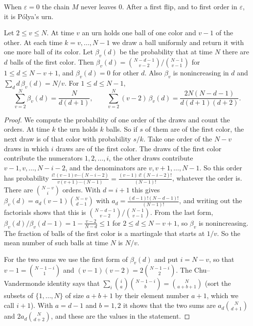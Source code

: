 When $\varepsilon=0$ the chain $M$ never leaves 0. After a first flip, and to
first order in $\varepsilon$, it is P\'olya's urn.

\begin{lemma}\label{lem:urn}
Let $2\le v\le N$. At time $v$ an urn holds one ball of one color and $v-1$
of the other. At each time $k=v,\dots,N-1$ we draw a ball uniformly and
return it with one more ball of its color. Let $\beta_v(d)$ be the
probability that at time $N$ there are $d$ balls of the first color. Then
$\beta_v(d)=\binom{N-d-1}{v-2}/\binom{N-1}{v-1}$ for $1\le d\le N-v+1$, and
$\beta_v(d)=0$ for other $d$. Also $\beta_v$ is nonincreasing in $d$ and
$\sum_dd\,\beta_v(d)=N/v$. For $1\le d\le N-1$,
\[
 \sum_{v=2}^N\beta_v(d)=\frac{N}{d(d+1)},\qquad
 \sum_{v=2}^N(v-2)\,\beta_v(d)=\frac{2N(N-d-1)}{d(d+1)(d+2)} .
\]
\end{lemma}

\begin{proof}
We compute the probability of one order of the draws and count the orders.
At time $k$ the urn holds $k$ balls. So if $s$ of them are of the first
color, the next draw is of that color with probability $s/k$. Take one order
of the $N-v$ draws in which $i$ draws are of the first color. The draws of
the first color contribute the numerators $1,2,\dots,i$, the other draws
contribute $v-1,v,\dots,N-i-2$, and the denominators are $v,v+1,\dots,N-1$.
So this order has probability
$\frac{i!\,(v-1)v\cdots(N-i-2)}{v(v+1)\cdots(N-1)}=\frac{(v-1)\,i!\,(N-i-2)!}{(N-1)!}$,
whatever the order is. There are $\binom{N-v}{i}$ orders. With $d=i+1$ this
gives $\beta_v(d)=a_d(v-1)\binom{N-v}{d-1}$ with
$a_d=\frac{(d-1)!(N-d-1)!}{(N-1)!}$, and writing out the factorials shows
that this is $\binom{N-d-1}{v-2}/\binom{N-1}{v-1}$. From the last form,
$\beta_v(d)/\beta_v(d-1)=1-\frac{v-2}{N-d}\le1$ for $2\le d\le N-v+1$, so
$\beta_v$ is nonincreasing. The fraction of balls of the first color is a
martingale that starts at $1/v$. So the mean number of such balls at time
$N$ is $N/v$.

For the two sums we use the first form of $\beta_v(d)$ and put $i=N-v$, so
that $v-1=\binom{N-1-i}1$ and $(v-1)(v-2)=2\binom{N-1-i}2$. The
Chu--Vandermonde identity says that
$\sum_i\binom ia\binom{N-1-i}b=\binom N{a+b+1}$ (sort the subsets of
$\{1,\dots,N\}$ of size $a+b+1$ by their element number $a+1$, which we call
$i+1$). With $a=d-1$ and $b=1,2$ it shows that the two sums are
$a_d\binom N{d+1}$ and $2a_d\binom N{d+2}$, and these are the values in the
statement.
\end{proof}

